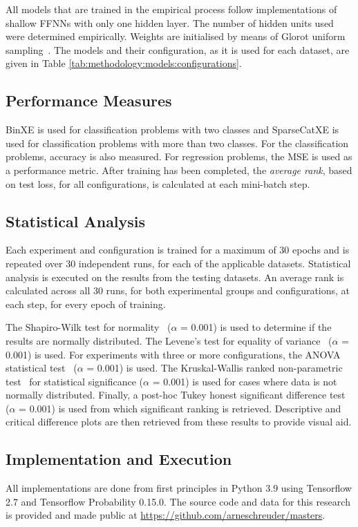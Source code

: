 All models that are trained in the empirical process follow implementations of shallow \acp{FFNN} with only one hidden layer. The number of hidden units used were determined empirically. Weights are initialised by means of Glorot uniform sampling~\cite{ref:glorot:2010}. The models and their configuration, as it is used for each dataset, are given in Table \ref{tab:methodology:models:configurations}.

\subsection{Performance Measures}\label{sec:methodology:performance_measures}

\acs{BinXE} is used for classification problems with two classes and \acs{SparseCatXE} is used for classification problems with more than two classes. For the classification problems, accuracy is also measured. For regression problems, the \acs{MSE} is used as a performance metric. After training has been completed, the \textit{average rank}, based on test loss, for all configurations, is calculated at each mini-batch step.


\subsection{Statistical Analysis}
\label{sec:methodology:statistical_analysis}

Each experiment and configuration is trained for a maximum of 30 epochs and is repeated over 30 independent runs, for each of the applicable datasets. Statistical analysis is executed on the results from the testing datasets. An average rank is calculated across all 30 runs, for both experimental groups and configurations, at each step, for every epoch of training.

The Shapiro-Wilk test for normality~\cite{ref:shapiro:1965} ($\alpha$ = 0.001) is used to determine if the results are normally distributed. The Levene's test for equality of variance~\cite{ref:levene:1961} ($\alpha$ = 0.001) is used. For experiments with three or more configurations, the \acs{ANOVA} statistical test~\cite{ref:fisher:1921} ($\alpha$ = 0.001) is used. The Kruskal-Wallis ranked non-parametric test~\cite{ref:kruskal:1952} for statistical significance ($\alpha$ = 0.001) is used for cases where data is not normally distributed. Finally, a post-hoc Tukey honest significant difference test~\cite{ref:tukey:1949} ($\alpha$ = 0.001) is used from which significant ranking is retrieved. Descriptive and critical difference plots are then retrieved from these results to provide visual aid.

\subsection{Implementation and Execution}\label{sec:methodology:implementation}

All implementations are done from first principles in Python 3.9 using Tensorflow 2.7 and Tensorflow Probability 0.15.0. The source code and data for this research is provided and made public at \url{https://github.com/arneschreuder/masters}.